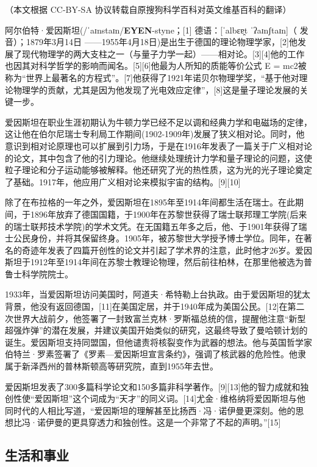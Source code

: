 
（本文根据 CC-BY-SA 协议转载自原搜狗科学百科对英文维基百科的翻译）

阿尔伯特·爱因斯坦(/ˈaɪnstaɪn/\textbf{EYEN}-styne；[1] 德语：[ˈalbɛɐ̯t ˈʔaɪnʃtaɪn]（ 发音）；1879年3月14日 ——1955年4月18日)是出生于德国的理论物理学家，[2]他发展了现代物理学的两大支柱之一（与量子力学一起）——相对论。[3][4]他的工作也因其对科学哲学的影响而闻名。[5][6]他最为人所知的质能等价公式 E = mc2被称为“世界上最著名的方程式”。[7]他获得了1921年诺贝尔物理学奖，“基于他对理论物理学的贡献，尤其是因为他发现了光电效应定律”，[8]这是量子理论发展的关键一步。

爱因斯坦在职业生涯初期认为牛顿力学已经不足以调和经典力学和电磁场的定律，这让他在伯尔尼瑞士专利局工作期间(1902-1909年)发展了狭义相对论。同时，他意识到相对论原理也可以扩展到引力场，于是在1916年发表了一篇关于广义相对论的论文，其中包含了他的引力理论。他继续处理统计力学和量子理论的问题，这使粒子理论和分子运动能够被解释。他还研究了光的热性质，这为光的光子理论奠定了基础。1917年，他应用广义相对论来模拟宇宙的结构。[9][10]

除了在布拉格的一年之外，爱因斯坦在1895年至1914年间都生活在瑞士。在此期间，于1896年放弃了德国国籍，于1900年在苏黎世获得了瑞士联邦理工学院(后来的瑞士联邦技术学院)的学术文凭。在无国籍五年多之后，他、于1901年获得了瑞士公民身份，并将其保留终身。1905年，被苏黎世大学授予博士学位。同年，在著名的奇迹年发表了四篇开创性的论文并引起了学术界的注意，此时他才26岁。爱因斯坦于1912年至1914年间在苏黎士教理论物理，然后前往柏林，在那里他被选为普鲁士科学院院士。

1933年，当爱因斯坦访问美国时，阿道夫·希特勒上台执政。由于爱因斯坦的犹太背景，他没有返回德国，[11]在美国定居，并于1940年成为美国公民。[12]在第二次世界大战前夕，他签署了一封致富兰克林·罗斯福总统的信，提醒他注意“新型超强炸弹”的潜在发展，并建议美国开始类似的研究，这最终导致了曼哈顿计划的诞生。爱因斯坦支持同盟国，但他谴责将核裂变作为武器的想法。他与英国哲学家伯特兰·罗素签署了《罗素—爱因斯坦宣言条约》，强调了核武器的危险性。他隶属于新泽西州的普林斯顿高等研究院，直到1955年去世。

爱因斯坦发表了300多篇科学论文和150多篇非科学著作。[9][13]他的智力成就和独创性使“爱因斯坦”这个词成为“天才”的同义词。[14]尤金·维格纳将爱因斯坦与他同时代的人相比写道，“爱因斯坦的理解甚至比扬西·冯·诺伊曼更深刻。他的思想比冯·诺伊曼的更具穿透力和独创性。这是一个非常了不起的声明。”[15]

\subsection{生活和事业}
